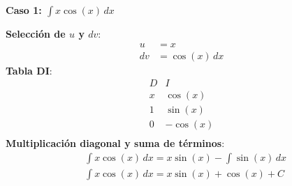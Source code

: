 \begin{example}
    \textbf{Caso 1: \( \int x \cos(x) \, dx \)}
    
    \textbf{Selección de \( u \) y \( dv \)}:
    \begin{align*}
    u &= x \\
    dv &= \cos(x) \, dx
    \end{align*}
    \textbf{Tabla DI}:
\begin{equation*}
    \begin{array}{c|c}
        D & I \\
        \hline
        x & \cos(x) \\
        1 & \sin(x) \\
        0 & -\cos(x) \\
        \end{array}
\end{equation*}
    \textbf{Multiplicación diagonal y suma de términos}:
    \begin{align*}
        &\int x \cos(x) \, dx = x \sin(x) - \int \sin(x) \, dx\\ 
        &\int x \cos(x) \, dx = x \sin(x) + \cos(x) + C
    \end{align*}
\end{example}
